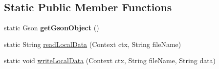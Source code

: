 \subsection*{Static Public Member Functions}
\begin{DoxyCompactItemize}
\item 
\hypertarget{classcom_1_1ualberta_1_1team17_1_1datamanager_1_1_data_manager_adfadd4123ff6714dccb403351be6fb53}{static Gson {\bfseries get\+Gson\+Object} ()}\label{classcom_1_1ualberta_1_1team17_1_1datamanager_1_1_data_manager_adfadd4123ff6714dccb403351be6fb53}

\item 
static String \hyperlink{classcom_1_1ualberta_1_1team17_1_1datamanager_1_1_data_manager_a7dee3e6821598e7cdb807b4800af2b00}{read\+Local\+Data} (Context ctx, String file\+Name)
\item 
static void \hyperlink{classcom_1_1ualberta_1_1team17_1_1datamanager_1_1_data_manager_a11e69b34a2aa12f257a338515932e6b3}{write\+Local\+Data} (Context ctx, String file\+Name, String data)
\end{DoxyCompactItemize}



